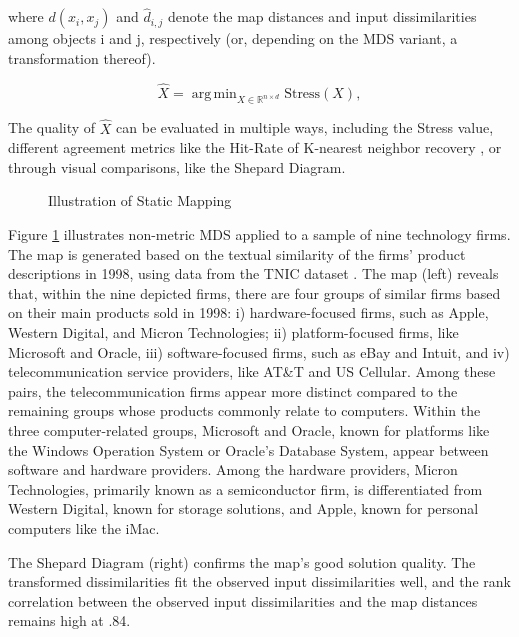 \documentclass[article]{jss}
\DeclareMathOperator*{\argmin}{arg\,min}  %
\begin{document}
where $d(x_i, x_j)$ and $\hat{d}_{i,j}$ denote the map distances and input dissimilarities among objects i and j, respectively 
(or, depending on the MDS variant, a transformation thereof).

\begin{equation} \label{eq:xhat}
  \hat{X} = \argmin_{X \in \mathbb{R}^{n \times d}} \text{Stress}(X),
\end{equation}

The quality of $\hat{X}$ can be evaluated in multiple ways, including the Stress value, different agreement metrics 
like the Hit-Rate of K-nearest neighbor recovery \citep{Chen+Buja:2009}, or through visual comparisons, like the 
Shepard Diagram.  

\begin{figure}
  \centering
  \caption{\label{fig:static-map} Illustration of Static Mapping}
\end{figure}
  
Figure \ref{fig:static-map} illustrates non-metric MDS applied to a sample of nine technology firms. The map is generated 
based on the textual similarity of the firms' product descriptions in 1998, using data from the TNIC dataset \citep{Hoberg+Phillips:2016}.
The map (left) reveals that, within the nine depicted firms, there are four 
groups of similar firms based on their main products sold in 1998: i) hardware-focused firms, such
as Apple, Western Digital, and Micron Technologies; ii) platform-focused firms, like Microsoft and
Oracle, iii) software-focused firms, such as eBay and Intuit, and iv) telecommunication service
providers, like AT\&T and US Cellular. Among these pairs, the telecommunication firms appear
more distinct compared to the remaining groups whose products commonly relate to computers.
Within the three computer-related groups, Microsoft and Oracle, known for platforms like the
Windows Operation System or Oracle’s Database System, appear between software and hardware
providers. Among the hardware providers, Micron Technologies, primarily known as a
semiconductor firm, is differentiated from Western Digital, known for storage solutions, 
and Apple, known for personal computers like the iMac.

The Shepard Diagram (right) confirms the map's good solution quality. The transformed
dissimilarities fit the observed input dissimilarities well, and the rank correlation between the
observed input dissimilarities and the map distances remains high at .84. 
\end{document}
